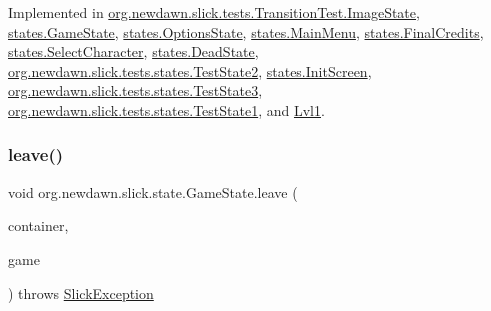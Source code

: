 Implemented in \mbox{\hyperlink{classorg_1_1newdawn_1_1slick_1_1tests_1_1_transition_test_1_1_image_state_a34a3137ea1f75dbcb0ebfa2ee40bb13f}{org.\+newdawn.\+slick.\+tests.\+Transition\+Test.\+Image\+State}}, \mbox{\hyperlink{classstates_1_1_game_state_a3fe60e1878feb13a073438a647273343}{states.\+Game\+State}}, \mbox{\hyperlink{classstates_1_1_options_state_a173809c3faa8e5ba70be2b5c3b374899}{states.\+Options\+State}}, \mbox{\hyperlink{classstates_1_1_main_menu_adbc27fa7433e43c8cbb8bb86db82daa1}{states.\+Main\+Menu}}, \mbox{\hyperlink{classstates_1_1_final_credits_acb91cf3998cc530727fb2ca5926c57b1}{states.\+Final\+Credits}}, \mbox{\hyperlink{classstates_1_1_select_character_af65a8be402fe3506397f096d75a8adf2}{states.\+Select\+Character}}, \mbox{\hyperlink{classstates_1_1_dead_state_a0ef2cdab84227544109b871136e629eb}{states.\+Dead\+State}}, \mbox{\hyperlink{classorg_1_1newdawn_1_1slick_1_1tests_1_1states_1_1_test_state2_a90fa7ac501b43d077653fbb8e158fe82}{org.\+newdawn.\+slick.\+tests.\+states.\+Test\+State2}}, \mbox{\hyperlink{classstates_1_1_init_screen_aaf434e33dbe6466006ef3693e1140c7c}{states.\+Init\+Screen}}, \mbox{\hyperlink{classorg_1_1newdawn_1_1slick_1_1tests_1_1states_1_1_test_state3_ad83c2a6d037e5d73d45f0ffea9d332cc}{org.\+newdawn.\+slick.\+tests.\+states.\+Test\+State3}}, \mbox{\hyperlink{classorg_1_1newdawn_1_1slick_1_1tests_1_1states_1_1_test_state1_aac578ad98e5a4631d030cb36d8d421de}{org.\+newdawn.\+slick.\+tests.\+states.\+Test\+State1}}, and \mbox{\hyperlink{class_lvl1_a4b928f9625e0441dae8ed54bfdf479cc}{Lvl1}}.

\mbox{\label{interfaceorg_1_1newdawn_1_1slick_1_1state_1_1_game_state_a3198498951e2674dac79b3c81f7af0f0}} 
\subsubsection{\texorpdfstring{leave()}{leave()}}
{\footnotesize\ttfamily void org.\+newdawn.\+slick.\+state.\+Game\+State.\+leave (\begin{DoxyParamCaption}\item[{\mbox{\hyperlink{classorg_1_1newdawn_1_1slick_1_1_game_container}{Game\+Container}}}]{container,  }\item[{\mbox{\hyperlink{classorg_1_1newdawn_1_1slick_1_1state_1_1_state_based_game}{State\+Based\+Game}}}]{game }\end{DoxyParamCaption}) throws \mbox{\hyperlink{classorg_1_1newdawn_1_1slick_1_1_slick_exception}{Slick\+Exception}}}

